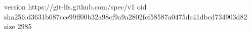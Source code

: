 version https://git-lfs.github.com/spec/v1
oid sha256:d3631b687cce99ff00b32a98cf9a9a2802fcf58587a0475dc41dbcd734903d82
size 2985
